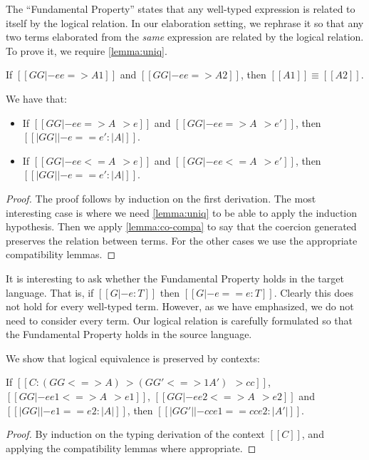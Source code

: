 The ``Fundamental Property'' states that any well-typed expression is related to
itself by the logical relation. In our elaboration setting, we rephrase it so
that any two \tname terms elaborated from the \textit{same} \name expression are related
by the logical relation. To prove it, we require \cref{lemma:uniq}.

\begin{theorem} \label{lemma:uniq}
  If $[[GG |- ee => A1]]$ and $[[GG |- ee => A2]]$, then $[[A1]] \equiv [[A2]]$.
\end{theorem}

\begin{theorem}  \label{thm:co-log} We have that:
  \begin{itemize}
  \item If $[[GG |- ee => A ~~> e]]$ and $[[GG |- ee => A ~~> e']]$, then $[[|GG| |- e == e' : |A| ]]$.
  \item If $[[GG |- ee <= A ~~> e]]$ and $[[GG |- ee <= A ~~> e']]$, then $[[|GG| |- e == e' : |A| ]]$.
  \end{itemize}
\end{theorem}
\begin{proof}
  The proof follows by induction on the first derivation. The most interesting case is 
  where we need \cref{lemma:uniq} to be able to
  apply the induction hypothesis. Then we apply \cref{lemma:co-compa} to say
  that the coercion generated preserves the relation between terms. For the other cases
  we use the appropriate compatibility lemmas.
\end{proof}
\begin{remark}
  It is interesting to ask whether the Fundamental Property holds in the target language. That is,
  if $[[G |- e : T]]$ then $[[G |- e == e : T]]$. Clearly this does not
  hold for every well-typed \tname term. However, as we have emphasized, we do
  not need to consider every \tname term. Our logical relation is carefully formulated
  so that the Fundamental Property holds in the source language.
\end{remark}


We show that logical equivalence is preserved by \name contexts:

\begin{lemma}[Congruence] \label{lemma:cong}
 If $[[C : (GG <=> A) ~> (GG' <=>1 A') ~~> cc]]$, $[[GG |- ee1 <=> A ~~> e1]]$, $[[GG |- ee2 <=> A ~~> e2]]$
 and $[[|GG| |- e1 == e2 : |A|]]$, then $[[|GG'| |- cc{e1} == cc{e2} : |A'|]]$.
\end{lemma}
\begin{proof}
  By induction on the typing derivation of the context $[[C]]$, and applying
  the compatibility lemmas where appropriate.
\end{proof}


